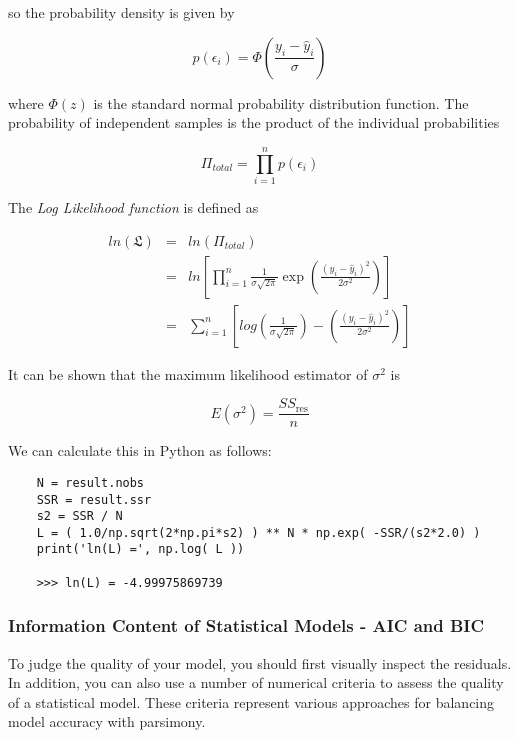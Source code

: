 so the probability density is given by

\begin{equation}
  p(\epsilon_i) =  \Phi (\frac{y_i - \hat{y}_i}{\sigma})
\end{equation}

where $\Phi(z)$ is the standard normal probability distribution function. The probability of independent samples is the product of the individual probabilities

\begin{equation}
  \Pi_{total} = \prod_{i=1}^n p(\epsilon_i)
\end{equation}

The \emph{Log Likelihood function}  is defined as

\begin{eqnarray*}
  ln(\mathfrak{L}) &=& ln(\Pi_{total}) \\
  &=& ln\left[\prod_{i=1}^n \frac{1}{\sigma\sqrt{2 \pi}} \exp \left(\frac{(y_i - \hat{y}_i)^2}{2 \sigma^2}\right)\right] \\
  &=& \sum_{i=1}^n\left[log\left(\frac{1}{\sigma \sqrt{2 \pi}}\right)- \left(\frac{(y_i - \hat{y}_i)^2}{2 \sigma^2}\right)\right]
\end{eqnarray*}

It can be shown that the maximum likelihood estimator of $\sigma^2$ is

\begin{equation}
  E(\sigma^2) = \frac{SS_\text{res}}{n}
\end{equation}

We can calculate this in Python as follows:

\begin{lstlisting}
    N = result.nobs
    SSR = result.ssr
    s2 = SSR / N
    L = ( 1.0/np.sqrt(2*np.pi*s2) ) ** N * np.exp( -SSR/(s2*2.0) )
    print('ln(L) =', np.log( L ))

    >>> ln(L) = -4.99975869739

\end{lstlisting}


\subsubsection{Information Content of Statistical Models - AIC and BIC}

To judge the quality of your model, you should first visually inspect the residuals. In addition, you can also use a number of numerical criteria to assess the quality of a statistical model. These criteria represent various approaches for balancing model accuracy with parsimony.

